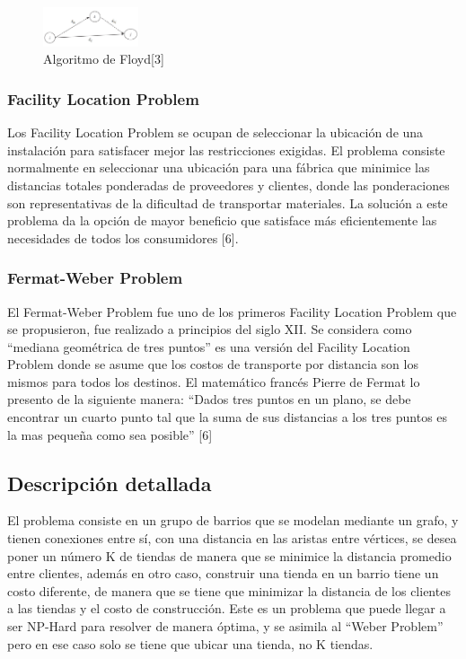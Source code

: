 \documentclass[conference,compsoc]{IEEEtran}
\begin{document}
\begin{figure}[h]
    \centering
    \includegraphics[width=0.25\textwidth]{Problema1/PL2.png}
    \caption{Algoritmo de Floyd[3]}
    \label{fig:mesh1}
\end{figure}


\subsubsection{Facility Location Problem}
Los Facility Location Problem  se ocupan de seleccionar la ubicación de una instalación para satisfacer mejor las restricciones exigidas. El problema consiste normalmente en seleccionar una ubicación para una fábrica que minimice las distancias totales ponderadas de proveedores y clientes, donde las ponderaciones son representativas de la dificultad de transportar materiales. La solución a este problema da la opción de mayor beneficio que satisface más eficientemente las necesidades de todos los consumidores [6].

\subsubsection{Fermat-Weber Problem}
El Fermat-Weber Problem fue uno de los primeros Facility Location Problem que se propusieron, fue realizado a principios del siglo XII. Se considera como “mediana geométrica de tres puntos” es una versión del Facility Location Problem donde se asume que los costos de transporte por distancia son los mismos para todos los destinos. 
El matemático francés Pierre de Fermat lo presento de la siguiente manera:
“Dados tres puntos en un plano, se debe encontrar un cuarto punto tal que la suma de sus distancias a los tres puntos es la mas pequeña como sea posible” [6]


\subsection{Descripción detallada}
El problema consiste en un grupo de barrios que se modelan mediante un grafo, y tienen conexiones entre sí, con una distancia en las aristas entre vértices, se desea poner un número K de tiendas de manera que se minimice la distancia promedio entre clientes, además en otro caso, construir una tienda en un barrio tiene un costo diferente, de manera que se tiene que minimizar la distancia de los clientes a las tiendas y el costo de construcción.
Este es un problema que puede llegar a ser NP-Hard para resolver de manera óptima, y se asimila al “Weber Problem” pero en ese caso solo se tiene que ubicar una tienda, no K tiendas.
\end{document}
